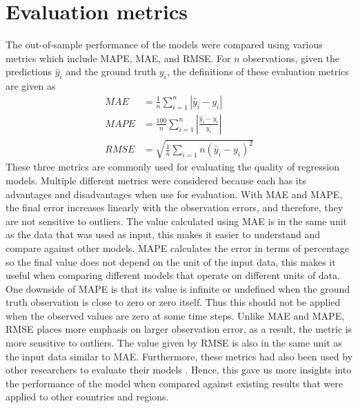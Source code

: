 \section{Evaluation metrics}
\label{sec:methodologies-evaluation-metrics}

The out-of-sample performance of the models were compared using various metrics which include \gls{MAPE}, \gls{MAE}, and \gls{RMSE}. For $n$ observations, given the predictions $\hat{y}_i$ and the ground truth $y_i$, the definitions of these evaluation metrics are given as
\begin{align*}
    MAE &= \frac{1}{n} \sum_{i=1}^n \left| \hat{y}_i - y_i \right| \\
    MAPE &= \frac{100}{n} \sum_{i=1}^n \left| \frac{\hat{y}_i - y_i}{y_i} \right| \\
    RMSE &= \sqrt{\frac{1}{n} \sum_{i=1}{n} (\hat{y}_i - y_i)^2}
\end{align*}
These three metrics are commonly used for evaluating the quality of regression models.
Multiple different metrics were considered because each has its advantages and disadvantages when use for evaluation.
With \gls{MAE} and \gls{MAPE}, the final error increases linearly with the observation errors, and therefore, they are not sensitive to outliers.
The value calculated using \gls{MAE} is in the same unit as the data that was used as input, this makes it easier to understand and compare against other models.
\gls{MAPE} calculates the error in terms of percentage so the final value does not depend on the unit of the input data, this makes it useful when comparing different models that operate on different units of data.
One downside of \gls{MAPE} is that its value is infinite or undefined when the ground truth observation is close to zero or zero itself.
Thus this should not be applied when the observed values are zero at some time steps.
Unlike \gls{MAE} and \gls{MAPE}, \gls{RMSE} places more emphasis on larger observation error, as a result, the metric is more sensitive to outliers.
The value given by \gls{RMSE} is also in the same unit as the input data similar to \gls{MAE}.
Furthermore, these metrics had also been used by other researchers to evaluate their models \cite{rayEnsembleForecastsCoronavirus2020, ihmecovid-19forecastingteamModelingCOVID19Scenarios2021,arikInterpretableSequenceLearning}.
Hence, this gave us more insights into the performance of the model when compared against existing results that were applied to other countries and regions.
